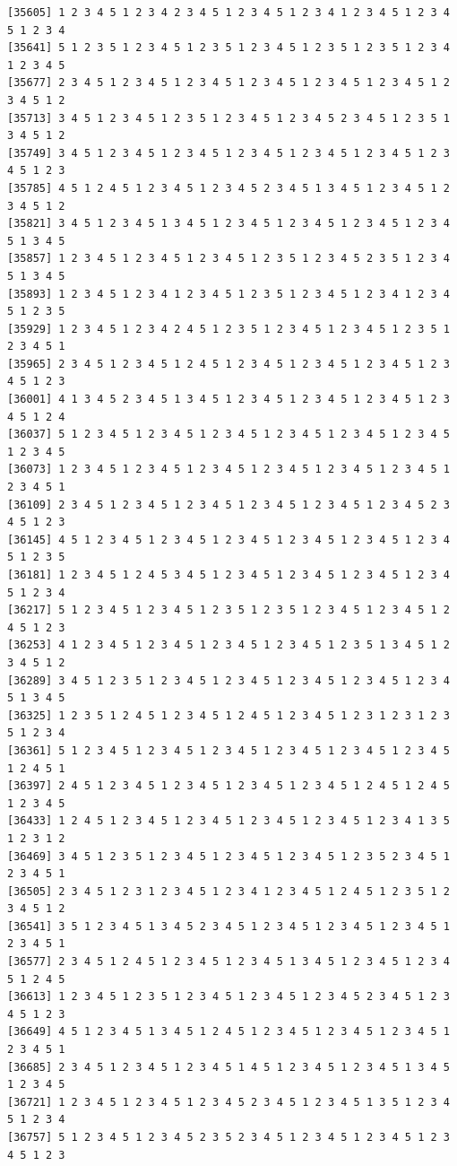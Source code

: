 \documentclass[
  11pt,
]{book}
\begin{document}
\begin{verbatim}
[35605] 1 2 3 4 5 1 2 3 4 2 3 4 5 1 2 3 4 5 1 2 3 4 1 2 3 4 5 1 2 3 4 5 1 2 3 4
[35641] 5 1 2 3 5 1 2 3 4 5 1 2 3 5 1 2 3 4 5 1 2 3 5 1 2 3 5 1 2 3 4 1 2 3 4 5
[35677] 2 3 4 5 1 2 3 4 5 1 2 3 4 5 1 2 3 4 5 1 2 3 4 5 1 2 3 4 5 1 2 3 4 5 1 2
[35713] 3 4 5 1 2 3 4 5 1 2 3 5 1 2 3 4 5 1 2 3 4 5 2 3 4 5 1 2 3 5 1 3 4 5 1 2
[35749] 3 4 5 1 2 3 4 5 1 2 3 4 5 1 2 3 4 5 1 2 3 4 5 1 2 3 4 5 1 2 3 4 5 1 2 3
[35785] 4 5 1 2 4 5 1 2 3 4 5 1 2 3 4 5 2 3 4 5 1 3 4 5 1 2 3 4 5 1 2 3 4 5 1 2
[35821] 3 4 5 1 2 3 4 5 1 3 4 5 1 2 3 4 5 1 2 3 4 5 1 2 3 4 5 1 2 3 4 5 1 3 4 5
[35857] 1 2 3 4 5 1 2 3 4 5 1 2 3 4 5 1 2 3 5 1 2 3 4 5 2 3 5 1 2 3 4 5 1 3 4 5
[35893] 1 2 3 4 5 1 2 3 4 1 2 3 4 5 1 2 3 5 1 2 3 4 5 1 2 3 4 1 2 3 4 5 1 2 3 5
[35929] 1 2 3 4 5 1 2 3 4 2 4 5 1 2 3 5 1 2 3 4 5 1 2 3 4 5 1 2 3 5 1 2 3 4 5 1
[35965] 2 3 4 5 1 2 3 4 5 1 2 4 5 1 2 3 4 5 1 2 3 4 5 1 2 3 4 5 1 2 3 4 5 1 2 3
[36001] 4 1 3 4 5 2 3 4 5 1 3 4 5 1 2 3 4 5 1 2 3 4 5 1 2 3 4 5 1 2 3 4 5 1 2 4
[36037] 5 1 2 3 4 5 1 2 3 4 5 1 2 3 4 5 1 2 3 4 5 1 2 3 4 5 1 2 3 4 5 1 2 3 4 5
[36073] 1 2 3 4 5 1 2 3 4 5 1 2 3 4 5 1 2 3 4 5 1 2 3 4 5 1 2 3 4 5 1 2 3 4 5 1
[36109] 2 3 4 5 1 2 3 4 5 1 2 3 4 5 1 2 3 4 5 1 2 3 4 5 1 2 3 4 5 2 3 4 5 1 2 3
[36145] 4 5 1 2 3 4 5 1 2 3 4 5 1 2 3 4 5 1 2 3 4 5 1 2 3 4 5 1 2 3 4 5 1 2 3 5
[36181] 1 2 3 4 5 1 2 4 5 3 4 5 1 2 3 4 5 1 2 3 4 5 1 2 3 4 5 1 2 3 4 5 1 2 3 4
[36217] 5 1 2 3 4 5 1 2 3 4 5 1 2 3 5 1 2 3 5 1 2 3 4 5 1 2 3 4 5 1 2 4 5 1 2 3
[36253] 4 1 2 3 4 5 1 2 3 4 5 1 2 3 4 5 1 2 3 4 5 1 2 3 5 1 3 4 5 1 2 3 4 5 1 2
[36289] 3 4 5 1 2 3 5 1 2 3 4 5 1 2 3 4 5 1 2 3 4 5 1 2 3 4 5 1 2 3 4 5 1 3 4 5
[36325] 1 2 3 5 1 2 4 5 1 2 3 4 5 1 2 4 5 1 2 3 4 5 1 2 3 1 2 3 1 2 3 5 1 2 3 4
[36361] 5 1 2 3 4 5 1 2 3 4 5 1 2 3 4 5 1 2 3 4 5 1 2 3 4 5 1 2 3 4 5 1 2 4 5 1
[36397] 2 4 5 1 2 3 4 5 1 2 3 4 5 1 2 3 4 5 1 2 3 4 5 1 2 4 5 1 2 4 5 1 2 3 4 5
[36433] 1 2 4 5 1 2 3 4 5 1 2 3 4 5 1 2 3 4 5 1 2 3 4 5 1 2 3 4 1 3 5 1 2 3 1 2
[36469] 3 4 5 1 2 3 5 1 2 3 4 5 1 2 3 4 5 1 2 3 4 5 1 2 3 5 2 3 4 5 1 2 3 4 5 1
[36505] 2 3 4 5 1 2 3 1 2 3 4 5 1 2 3 4 1 2 3 4 5 1 2 4 5 1 2 3 5 1 2 3 4 5 1 2
[36541] 3 5 1 2 3 4 5 1 3 4 5 2 3 4 5 1 2 3 4 5 1 2 3 4 5 1 2 3 4 5 1 2 3 4 5 1
[36577] 2 3 4 5 1 2 4 5 1 2 3 4 5 1 2 3 4 5 1 3 4 5 1 2 3 4 5 1 2 3 4 5 1 2 4 5
[36613] 1 2 3 4 5 1 2 3 5 1 2 3 4 5 1 2 3 4 5 1 2 3 4 5 2 3 4 5 1 2 3 4 5 1 2 3
[36649] 4 5 1 2 3 4 5 1 3 4 5 1 2 4 5 1 2 3 4 5 1 2 3 4 5 1 2 3 4 5 1 2 3 4 5 1
[36685] 2 3 4 5 1 2 3 4 5 1 2 3 4 5 1 4 5 1 2 3 4 5 1 2 3 4 5 1 3 4 5 1 2 3 4 5
[36721] 1 2 3 4 5 1 2 3 4 5 1 2 3 4 5 2 3 4 5 1 2 3 4 5 1 3 5 1 2 3 4 5 1 2 3 4
[36757] 5 1 2 3 4 5 1 2 3 4 5 2 3 5 2 3 4 5 1 2 3 4 5 1 2 3 4 5 1 2 3 4 5 1 2 3

\end{verbatim}
\end{document}
